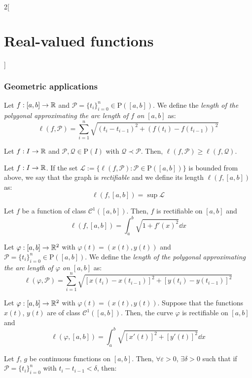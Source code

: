 \documentclass[../../../main.tex]{subfiles}
\begin{document}
\begin{multicols}{2}[\section{Real-valued functions}]
    \subsubsection*{Geometric applications}
    \begin{definition}
        Let $f:[a,b]\rightarrow\mathbb{R}$ and $\mathcal{P}=\{t_i\}_{i=0}^n\in\mathrm{P}([a,b])$. We define the \textit{length of the polygonal approximating the arc length of $f$ on $[a,b]$} as: $$\ell(f,\mathcal{P})=\sum_{i=1}^n\sqrt{{(t_i-t_{i-1})}^2+{(f(t_i)-f(t_{i-1}))}^2}$$
    \end{definition}
    \begin{lemma}
        Let $f:I\rightarrow\mathbb{R}$ and $\mathcal{P},\mathcal{Q}\in\mathrm{P}(I)$ with $\mathcal{Q}\prec\mathcal{P}$. Then, $\ell(f,\mathcal{P})\geq \ell(f,\mathcal{Q})$.
    \end{lemma}
    \begin{definition}
        Let $f:I\rightarrow\mathbb{R}$. If the set $\mathcal{L}:=\{\ell(f,\mathcal{P}):\mathcal{P}\in\mathrm{P}([a,b])\}$ is bounded from above, we say that the graph is \textit{rectifiable} and we define its length $\ell(f,[a,b])$ as: $$\ell(f,[a,b])=\sup \mathcal{L}$$
    \end{definition}
    \begin{prop}
        Let $f$ be a function of class $\mathcal{C}^1([a,b])$. Then, $f$ is rectifiable on $[a,b]$ and $$\ell(f,[a,b])=\int_a^b\sqrt{1+{f'(x)}^2}\dd x$$
    \end{prop}
    \begin{definition}
        Let $\varphi:[a,b]\rightarrow\mathbb{R}^2$ with $\varphi(t)=(x(t),y(t))$ and $\mathcal{P}=\{t_i\}_{i=0}^n\in\mathrm{P}([a,b])$. We define the \textit{length of the polygonal approximating the arc length of $\varphi$ on $[a,b]$} as: $$\ell(\varphi,\mathcal{P})=\sum_{i=1}^n\sqrt{{[x(t_i)-x(t_{i-1})]}^2+{[y(t_i)-y(t_{i-1})]}^2}$$
    \end{definition}
    \begin{prop}
        Let $\varphi:[a,b]\rightarrow\mathbb{R}^2$ with $\varphi(t)=(x(t),y(t))$. Suppose that the functions $x(t)$, $y(t)$ are of class $\mathcal{C}^1([a,b])$. Then, the curve $\varphi$ is rectifiable on $[a,b]$ and $$\ell(\varphi,[a,b])=\int_a^b\sqrt{{[x'(t)]}^2+{[y'(t)]}^2}\dd x$$
    \end{prop}
    \begin{lemma}
        Let $f$, $g$ be continuous functions on $[a,b]$. Then, $\forall\varepsilon>0$, $\exists\delta>0$ such that if $\mathcal{P}=\{t_i\}_{i=0}^n$ with $t_i-t_{i-1}<\delta$, then:

\end{lemma}
\end{multicols}
\end{document}
